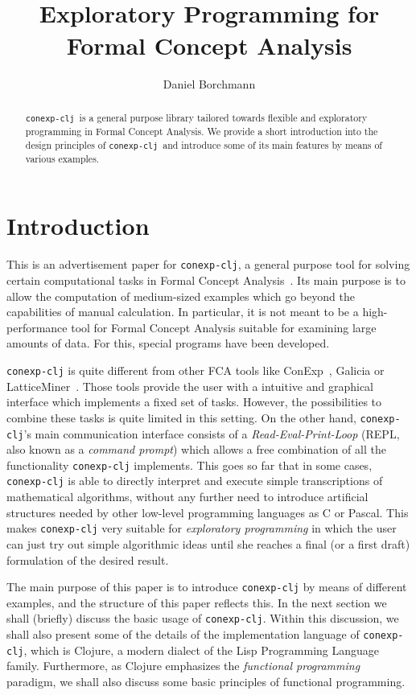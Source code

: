 \documentclass[oneside]{llncs}
\title{\cclj\\ Exploratory Programming for Formal Concept Analysis}
\author{Daniel Borchmann}
\institute{
  Institute of Algebra, TU Dresden\\
  \url{daniel.borchmann@mailbox.tu-dresden.de}
}
\newcommand{\cclj}{\texttt{conexp-clj}\xspace}
\begin{document}
\maketitle{}

\begin{abstract}
  \cclj\ is a general purpose library tailored towards flexible and exploratory
  programming in Formal Concept Analysis.  We provide a short introduction into the design
  principles of \cclj\ and introduce some of its main features by means of various
  examples.
\end{abstract}

\section{Introduction}
\label{sec:introduction}

This is an advertisement paper for \cclj, a general purpose tool for solving certain
computational tasks in Formal Concept Analysis~\cite{ganter1999formal}.  Its main purpose
is to allow the computation of medium-sized examples which go beyond the capabilities of
manual calculation.  In particular, it is not meant to be a high-performance tool for
Formal Concept Analysis suitable for examining large amounts of data.  For this, special
programs have been developed.

\cclj is quite different from other FCA tools like ConExp~\cite{conf/kii/yevtuschenko00},
Galicia or LatticeMiner~\cite{conf/icfca/LahcenK2010}.  Those tools provide the user with
a intuitive and graphical interface which implements a fixed set of tasks.  However, the
possibilities to combine these tasks is quite limited in this setting.  On the other hand,
\cclj's main communication interface consists of a \emph{Read-Eval-Print-Loop} (REPL, also
known as a \emph{command prompt}) which allows a free combination of all the functionality
\cclj implements.  This goes so far that in some cases, \cclj is able to directly
interpret and execute simple transcriptions of mathematical algorithms, without any
further need to introduce artificial structures needed by other low-level programming
languages as C or Pascal.  This makes \cclj very suitable for \emph{exploratory
  programming} in which the user can just try out simple algorithmic ideas until she
reaches a final (or a first draft) formulation of the desired result.

The main purpose of this paper is to introduce \cclj by means of different examples, and
the structure of this paper reflects this.  In the next section we shall (briefly) discuss
the basic usage of \cclj.  Within this discussion, we shall also present some of the
details of the implementation language of \cclj, which is Clojure, a modern dialect of the
Lisp Programming Language family.  Furthermore, as Clojure emphasizes the \emph{functional
  programming} paradigm, we shall also discuss some basic principles of functional
programming.
\end{document}

